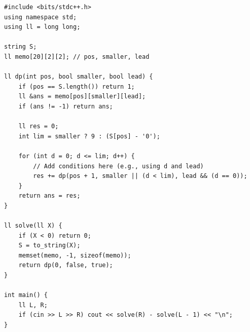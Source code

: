 
\begin{lstlisting}
#include <bits/stdc++.h>
using namespace std;
using ll = long long;

string S;
ll memo[20][2][2]; // pos, smaller, lead

ll dp(int pos, bool smaller, bool lead) {
    if (pos == S.length()) return 1;
    ll &ans = memo[pos][smaller][lead];
    if (ans != -1) return ans;

    ll res = 0;
    int lim = smaller ? 9 : (S[pos] - '0');

    for (int d = 0; d <= lim; d++) {
        // Add conditions here (e.g., using d and lead)
        res += dp(pos + 1, smaller || (d < lim), lead && (d == 0));
    }
    return ans = res;
}

ll solve(ll X) {
    if (X < 0) return 0;
    S = to_string(X);
    memset(memo, -1, sizeof(memo));
    return dp(0, false, true);
}

int main() {
    ll L, R;
    if (cin >> L >> R) cout << solve(R) - solve(L - 1) << "\n";
}
\end{lstlisting}